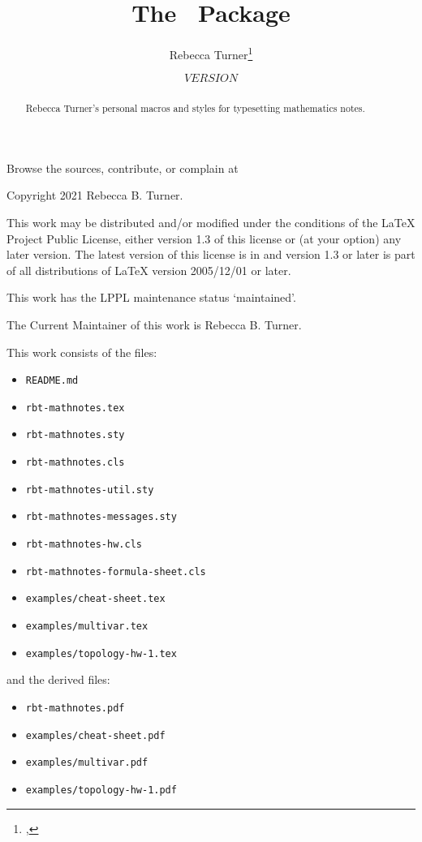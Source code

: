 \documentclass{ltxguidex}
\author{Rebecca Turner\thanks{\email{rbt@sent.as}, \https{becca.ooo}}}
\title{The \mn\ Package}
\date{${VERSION}$}
\begin{document}
\maketitle

\begin{abstract}
  Rebecca Turner's personal macros and styles for typesetting mathematics
  notes.
\end{abstract}

\begin{note}
  Browse the sources, contribute, or complain at \\
\end{note}

\begin{note}
  Copyright 2021 Rebecca B. Turner.

  This work may be distributed and/or modified under the
  conditions of the LaTeX Project Public License, either version 1.3
  of this license or (at your option) any later version.
  The latest version of this license is in
  and version 1.3 or later is part of all distributions of LaTeX
  version 2005/12/01 or later.

  This work has the LPPL maintenance status `maintained'.

  The Current Maintainer of this work is Rebecca B. Turner.

  This work consists of the files:
    \begin{itemize}
      \item \texttt{README.md}
      \item \texttt{rbt-mathnotes.tex}
      \item \texttt{rbt-mathnotes.sty}
      \item \texttt{rbt-mathnotes.cls}
      \item \texttt{rbt-mathnotes-util.sty}
      \item \texttt{rbt-mathnotes-messages.sty}
      \item \texttt{rbt-mathnotes-hw.cls}
      \item \texttt{rbt-mathnotes-formula-sheet.cls}
      \item \texttt{examples/cheat-sheet.tex}
      \item \texttt{examples/multivar.tex}
      \item \texttt{examples/topology-hw-1.tex}
    \end{itemize}
  and the derived files:
    \begin{itemize}
      \item \texttt{rbt-mathnotes.pdf}
      \item \texttt{examples/cheat-sheet.pdf}
      \item \texttt{examples/multivar.pdf}
      \item \texttt{examples/topology-hw-1.pdf}
    \end{itemize}
\end{note}
\end{document}
